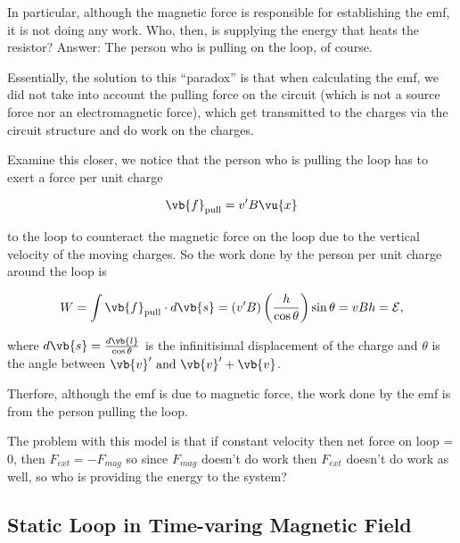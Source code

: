 \documentclass[english,a4paper,12pt]{report}
\begin{document}
In particular, although the magnetic force is responsible for establishing the emf, it is not doing any work. Who, then, is supplying the energy that heats the resistor? Answer: The person who is pulling on the loop, of course.

Essentially, the solution to this “paradox” is that when calculating the emf, we did not take into account the pulling force on the circuit (which is not a source force nor an electromagnetic force), which get transmitted to the charges via the circuit structure and do work on the charges.

Examine this closer, we notice that the person who is pulling the loop has to exert a force per unit charge 

\begin{equation}
    \vb{f} _{\text{pull} } = v' B \vu{x}  
\end{equation}

to the loop to counteract the magnetic force on the loop due to the vertical velocity of the moving charges. So the work done by the person per unit charge around the loop is 

\begin{equation}
    W = \int \vb{f} _{\text{pull} } \cdot  d \vb{s} =  (v'B) \left( \frac{h}{\cos \theta }   \right) \sin \theta = vBh = \mathcal{E} ,
\end{equation}

where \(d \vb{s} = \frac{d \vb{l} }{\cos \theta } \) is the infinitisimal displacement of the charge and \(\theta \) is the angle between \(\vb{v} ' \text { and } \vb{v} '+\vb{v} \). 

Therfore, although the emf is due to magnetic force, the work done by the emf is from the person pulling the loop.

The problem with this model is that if constant velocity then net force on loop = 0, then \(F_{ext} = - F_{mag} \) so since \(F_{mag} \) doesn't do work then \(F_{ext} \) doesn't do work as well, so who is providing the energy to the system?    

\subsection{Static Loop in Time-varing Magnetic Field}
\end{document}
